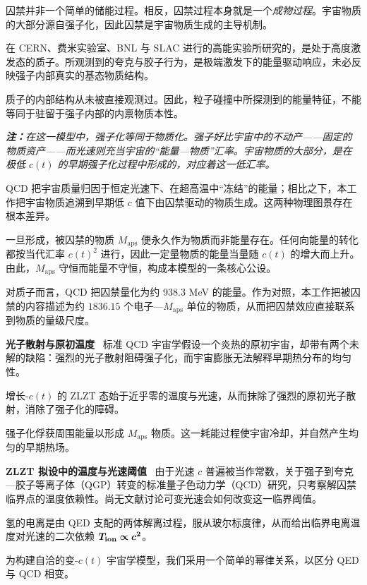 \documentclass[12pt,leqno]{article}
\begin{document}
	\medskip
	囚禁并非一个简单的储能过程。相反，囚禁过程本身就是一个{\textit{成物过程}}。宇宙物质的大部分源自强子化，因此囚禁是宇宙物质生成的主导机制。
	
	\medskip
	在 CERN、费米实验室、BNL 与 SLAC 进行的高能实验所研究的，是处于高度激发态的质子。所观测到的夸克与胶子行为，是极端激发下的能量驱动响应，未必反映强子内部真实的基态物质结构。
	
	\medskip
	质子的内部结构从未被直接观测过。因此，粒子碰撞中所探测到的能量特征，不能等同于驻留于强子内部的内禀物质本性。
	
	\medskip
	\textit{\textbf{注：}在这一模型中，强子化等同于{\textit{物质化}}。强子好比宇宙中的不动产——固定的物质资产——而光速则充当宇宙的“能量—物质”汇率。宇宙物质的大部分，是在极低 $c(t)$ 的早期强子化过程中形成的，对应着这一低汇率。}
	
	\medskip
	QCD 把宇宙质量归因于恒定光速下、在超高温中“冻结”的能量；相比之下，本工作把宇宙物质追溯到早期低 $c$ 值下由囚禁驱动的物质生成。这两种物理图景存在根本差异。
	
	\medskip
	一旦形成，被囚禁的物质 $M_{\mathrm{aps}}$ 便永久作为物质而非能量存在。任何向能量的转化都按当代汇率 $c(t)^2$ 进行，因此一定量物质的能量当量随 $c(t)$ 的增大而上升。由此，$M_{\mathrm{aps}}$ 守恒而能量不守恒，构成本模型的一条核心公设。
	
	\medskip
	对质子而言，QCD 把囚禁量化为约 938.3 MeV 的能量。作为对照，本工作把被囚禁的内容描述为约 $\boldsymbol{1836.15}$ 个电子—$M_{\mathrm{aps}}$ 单位的物质，从而把囚禁效应直接联系到物质的量级尺度。
	
	
	\medskip
	\bigskip
	\textbf{光子散射与原初温度}\,\,\,
	标准 QCD 宇宙学假设一个炎热的原初宇宙，却带有两个未解的缺陷：强烈的光子散射阻碍强子化，而宇宙膨胀无法解释早期热分布的均匀性。
	
	\medskip
	增长-$c(t)$ 的 ZLZT 态始于近乎零的温度与光速，从而抹除了强烈的原初光子散射，消除了强子化的障碍。
	
	\medskip
	强子化俘获周围能量以形成 $M_{\mathrm{aps}}$ 物质。这一耗能过程使宇宙冷却，并自然产生均匀的早期热场。
	
	
	\medskip
	\bigskip
	\textbf{ZLZT 拟设中的温度与光速阈值}\,\,\,
	由于光速 $c$ 普遍被当作常数，关于强子到夸克—胶子等离子体（QGP）转变的标准量子色动力学（QCD）研究，只考察解囚禁临界点的温度依赖性。尚无文献讨论可变光速会如何改变这一临界阈值。
	
	\medskip
	氢的电离是由 QED 支配的两体解离过程，服从玻尔标度律，从而给出临界电离温度对光速的二次依赖 $\boldsymbol{T_{\rm ion} \propto c^2}$。
	
	\medskip
	为构建自洽的变-$c(t)$ 宇宙学模型，我们采用一个简单的幂律关系，以区分 QED 与 QCD 相变。 
	
\end{document}

